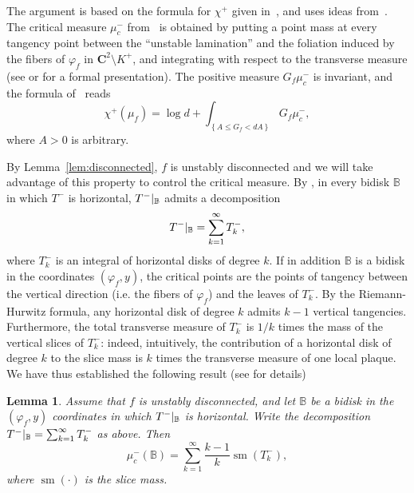 \documentclass[oneside, 12pt]{amsart}
\newcommand{\set}[1]{\left\{#1\right\}}
\newcommand{\rest}[1]{ \arrowvert_{#1}}
\DeclareMathOperator{\sm}{sm}
\newcommand{\C}{\mathbf{C}}
\newcommand{\bb}{\mathbb{B}}
\theoremstyle{plain}
\newtheorem{lem}[thm]{Lemma}
\theoremstyle{definition}
\numberwithin{equation}{section}       %
\numberwithin{equation}{section}       %
\begin{document}
The argument  is based on the formula for $\chi^+$ given in~\cite{bs5}, 
and uses ideas from~\cite{lyapunov}.  
The critical measure $\mu_c^-$ from~\cite{bs5} is obtained by putting a point mass at every tangency point between the ``unstable lamination''  
and the foliation induced by the fibers of $\varphi_f$ in $\C^2\setminus K^+$, and integrating with respect to the transverse measure (see \cite{bs5} or \cite[\S 2.4]{lyapunov} for a formal presentation).
The positive measure $G_f\mu_c^-$ is invariant, and
 the formula of~\cite{bs5} reads
\begin{equation}\label{eq:bs5}
\chi^+(\mu_f)= \log d + \int_{\set{A\leq G_f< dA}} G_f\mu_c^-,
\end{equation}
 where $A>0$ is arbitrary. 


By Lemma~\ref{lem:disconnected},  $f$ is unstably disconnected and we will take advantage of this property to control the critical measure. 
  By \cite[Thm 2.4]{connex}, in every bidisk $\bb$ in which $T^-$ is horizontal, 
  $T^-\rest{\bb}$ admits a decomposition 
  \begin{equation} T^-\rest{\bb}  = \sum_{k=1}^\infty T^-_k,  \label{eq:decomposition}
  \end{equation} where 
$T^-_k$ is an integral of horizontal disks   of degree $k$. If in addition $\bb$ is a bidisk in the coordinates $(\varphi_f, y)$, the critical points are the points of tangency 
between the vertical direction (i.e. the fibers of $\varphi_f$)  and  the leaves of $T^-_k$.  
By the Riemann-Hurwitz formula, any horizontal disk of degree $k$ admits $k-1$ vertical tangencies.
Furthermore, the total transverse measure of $T^-_k$ is $1/k$ times the mass
of the vertical slices of $T^-_k$: indeed, intuitively,
the contribution of   a horizontal disk of degree $k$  to the slice mass is $k$ times the transverse measure of one local plaque.
 We    have thus established the following result (see \cite[Prop. 2.15]{lyapunov} for details)

\begin{lem}\label{lem:critical_mass}
Assume that $f$ is unstably disconnected, and let $\bb$ be a bidisk in the  $(\varphi_f, y)$ coordinates in  which $T^-\rest{\bb}$ is horizontal. Write the decomposition 
 $T^-\rest{\bb}  = \sum_{k=1}^\infty T^-_k$  as above. 
Then $$\mu_c^-(\bb) = \sum_{k=1}^\infty \frac{k-1}{k} \sm(T^-_k),$$ where $\sm(\cdot)$ is the slice mass. 
\end{lem}
\end{document}
